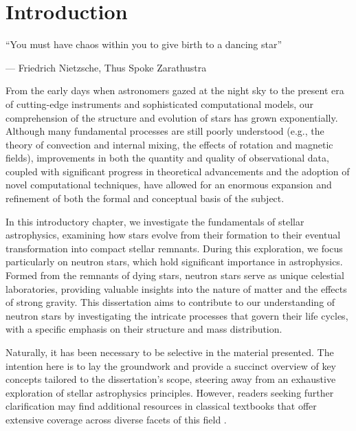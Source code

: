 \documentclass[main.tex]{subfiles}
\begin{document}
    \chapter{Introduction}
    \setlength{\epigraphwidth}{0.8\textwidth}
        \epigraph{
            ``You must have chaos within you to give birth to a dancing star''
    }{--- Friedrich Nietzsche, Thus Spoke Zarathustra}


    From the early days when astronomers gazed at the night sky to the present era of cutting-edge instruments and sophisticated computational models, our comprehension of the structure and evolution of stars has grown exponentially. Although many fundamental processes are still poorly understood (e.g., the theory of convection and internal mixing, the effects of rotation and magnetic fields), improvements in both the quantity and quality of observational data, coupled with significant progress in theoretical advancements and the adoption of novel computational techniques, have allowed for an enormous expansion and refinement of both the formal and conceptual basis of the subject.

    In this introductory chapter, we investigate the fundamentals of stellar astrophysics, examining how stars evolve from their formation to their eventual transformation into compact stellar remnants. During this exploration, we focus particularly on neutron stars, which hold significant importance in astrophysics. Formed from the remnants of dying stars, neutron stars serve as unique celestial laboratories, providing valuable insights into the nature of matter and the effects of strong gravity. This dissertation aims to contribute to our understanding of neutron stars by investigating the intricate processes that govern their life cycles, with a specific emphasis on their structure and mass distribution.

    Naturally, it has been necessary to be selective in the material presented. The intention here is to lay the groundwork and provide a succinct overview of key concepts tailored to the dissertation's scope, steering away from an exhaustive exploration of stellar astrophysics principles. However, readers seeking further clarification may find additional resources in classical textbooks that offer extensive coverage across diverse facets of this field \citep[e.g.,][]{Clayton, Prialnik, Eggleton, Kippenhahn, Carroll_Ostlie_2017}.
\end{document}
